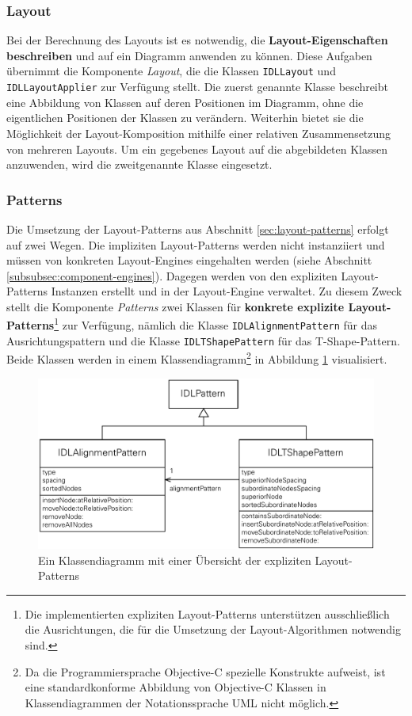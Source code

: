 \subsubsection{Layout}

Bei der Berechnung des Layouts ist es notwendig, die \textbf{Layout-Eigenschaften beschreiben} und auf ein Diagramm anwenden zu können. Diese Aufgaben übernimmt die Komponente \textit{Layout}, die die Klassen \texttt{IDLLayout} und \texttt{IDLLayoutApplier} zur Verfügung stellt. Die zuerst genannte Klasse beschreibt eine Abbildung von Klassen auf deren Positionen im Diagramm, ohne die eigentlichen Positionen der Klassen zu verändern. Weiterhin bietet sie die Möglichkeit der Layout-Komposition mithilfe einer relativen Zusammensetzung von mehreren Layouts. Um ein gegebenes Layout auf die abgebildeten Klassen anzuwenden, wird die zweitgenannte Klasse eingesetzt.

\subsubsection{Patterns}
\label{subsubsec:patterns}

Die Umsetzung der Layout-Patterns aus Abschnitt \ref{sec:layout-patterns} erfolgt auf zwei Wegen. Die impliziten Layout-Patterns werden nicht instanziiert und müssen von konkreten Layout-Engines eingehalten werden (siehe Abschnitt \ref{subsubsec:component-engines}). Dagegen werden von den expliziten Layout-Patterns Instanzen erstellt und in der Layout-Engine verwaltet. Zu diesem Zweck stellt die Komponente \textit{Patterns} zwei Klassen für \textbf{konkrete explizite Layout-Patterns}\footnote{Die implementierten expliziten Layout-Patterns unterstützen ausschließlich die Ausrichtungen, die für die Umsetzung der Layout-Algorithmen notwendig sind.} zur Verfügung, nämlich die Klasse \texttt{IDLAlignment\-Pat\-tern} für das Ausrichtungspattern und die Klasse \texttt{IDLTShapePattern} für das T-Shape-Pattern. Beide Klassen werden in einem Klassendiagramm\footnote{Da die Programmiersprache Objective-C spezielle Konstrukte aufweist, ist eine standardkonforme Abbildung von Objective-C Klassen in Klassendiagrammen der Notationssprache UML nicht möglich.} in Abbildung \ref{fig:layout-patterns-implementation} visualisiert.

\begin{figure}[hbt]
    \centering
    \includegraphics[scale=0.8]{assets/layout-patterns-implementation}
    \caption{Ein Klassendiagramm mit einer Übersicht der expliziten Layout-Patterns}
    \label{fig:layout-patterns-implementation}
\end{figure}


